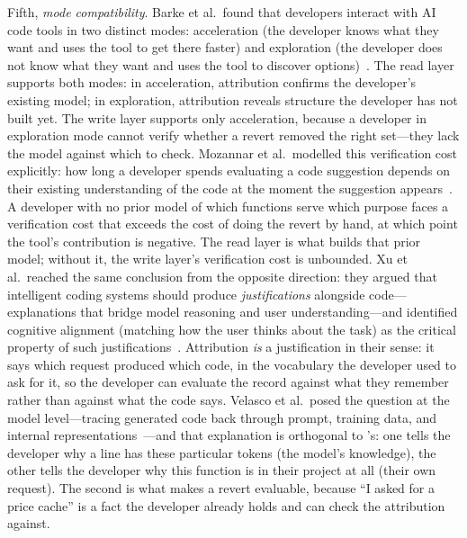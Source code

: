 Fifth, \emph{mode compatibility}. Barke et al.\ found that developers interact
with AI code tools in two distinct modes: acceleration (the developer knows what
they want and uses the tool to get there faster) and exploration (the developer
does not know what they want and uses the tool to discover
options)~\cite{barke2023}. The read layer supports both modes: in acceleration,
attribution confirms the developer's existing model; in exploration, attribution
reveals structure the developer has not built yet. The write layer supports only
acceleration, because a developer in exploration mode cannot verify whether a
revert removed the right set---they lack the model against which to check.
Mozannar et al.\ modelled this verification cost explicitly: how long a
developer spends evaluating a code suggestion depends on their existing
understanding of the code at the moment the suggestion
appears~\cite{mozannar2024}. A developer with no prior model of which functions
serve which purpose faces a verification cost that exceeds the cost of doing the
revert by hand, at which point the tool's contribution is negative. The read
layer is what builds that prior model; without it, the write layer's
verification cost is unbounded. Xu et al.\ reached the same conclusion from
the opposite direction: they argued that intelligent coding systems should
produce \emph{justifications} alongside code---explanations that bridge model
reasoning and user understanding---and identified cognitive alignment (matching
how the user thinks about the task) as the critical property of such
justifications~\cite{xu2025justifications}. Attribution \emph{is} a
justification in their sense: it says which request produced which code, in the
vocabulary the developer used to ask for it, so the developer can evaluate the
record against what they remember rather than against what the code says.
Velasco et al.\ posed the question at the model level---tracing generated code
back through prompt, training data, and internal
representations~\cite{velasco2026provenance}---and that explanation is orthogonal
to \sgt{}'s: one tells the developer why a line has these particular tokens
(the model's knowledge), the other tells the developer why this function is in
their project at all (their own request). The second is what makes a revert
evaluable, because ``I asked for a price cache'' is a fact the developer already
holds and can check the attribution against.

